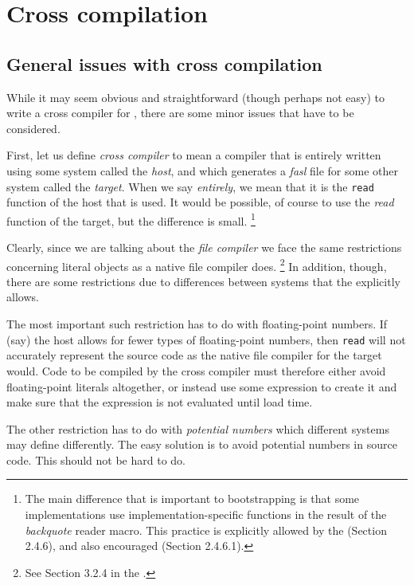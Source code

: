 \chapter{Cross compilation}
\label{chap-cross-compilation}

\section{General issues with cross compilation}

While it may seem obvious and straightforward (though perhaps not
easy) to write a cross compiler for \cl{}, there are some minor issues
that have to be considered. 

First, let us define \emph{cross compiler} to mean a compiler that is
entirely written using some \cl{} system called the \emph{host}, and
which generates a \emph{fasl} file for some other \cl{} system called
the \emph{target}.  When we say \emph{entirely}, we mean that it is
the \texttt{read} function of the host that is used.  It would be
possible, of course to use the \emph{read} function of the target, but
the difference is small.%
\footnote{The main difference that is important to bootstrapping is
  that some implementations use implementation-specific functions in
  the result of the \emph{backquote} reader macro.  This practice is
  explicitly allowed by the \hs{} (Section 2.4.6), and also encouraged
  (Section 2.4.6.1).}

Clearly, since we are talking about the \emph{file compiler} we face
the same restrictions concerning literal objects as a native file
compiler does.%
\footnote{See Section 3.2.4 in the \hs{}.} %
In addition, though, there are some restrictions due to differences
between systems that the \hs{} explicitly allows.  

The most important such restriction has to do with floating-point
numbers.  If (say) the host allows for fewer types of floating-point
numbers, then \texttt{read} will not accurately represent the source
code as the native file compiler for the target would.  Code to be
compiled by the cross compiler must therefore either avoid
floating-point literals altogether, or instead use some expression to
create it and make sure that the expression is not evaluated until
load time.  

The other restriction has to do with \emph{potential numbers} which
different systems may define differently.  The easy solution is to
avoid potential numbers in source code.  This should not be hard to
do. 

